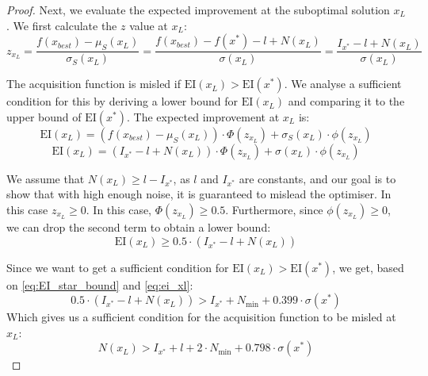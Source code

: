 {\begin{proof}
Next, we evaluate the expected improvement at the suboptimal solution $x_L$. We first calculate the $z$ value at $x_L$:
\begin{equation}
    \label{eq:z_xl}
    z_{x_L} = \frac{f(x_{best}) - \mu_S(x_L)}{\sigma_S(x_L)}=\frac{f(x_{best}) - f(x^*) - l + N(x_L)}{\sigma(x_L)}=\frac{I_{x^*}-l+N(x_L)}{\sigma(x_L)}
\end{equation}

The acquisition function is misled if $\mathrm{EI}(x_L) > \mathrm{EI}(x^*)$. We analyse a sufficient condition for this by deriving a lower bound for $\mathrm{EI}(x_L)$ and comparing it to the upper bound of $\mathrm{EI}(x^*)$. The expected improvement at $x_L$ is:
\begin{equation*}
    \mathrm{EI}(x_L) = (f(x_{best}) - \mu_S(x_L)) \cdot \Phi(z_{x_L}) + \sigma_S(x_L) \cdot \phi(z_{x_L})
\end{equation*}
\begin{equation*}
    \mathrm{EI}(x_L) = (I_{x^*} - l + N(x_L)) \cdot \Phi(z_{x_L}) + \sigma(x_L) \cdot \phi(z_{x_L})
\end{equation*}


We assume that $N(x_L) \ge l - I_{x^*}$, as $l$ and $I_{x^*}$ are constants, and our goal is to show that with high enough noise, it is guaranteed to mislead the optimiser.
In this case $z_{x_L} \ge 0$. In this case, $\Phi(z_{x_L}) \ge 0.5$. Furthermore, since $\phi(z_{x_L}) \ge 0$, we can drop the second term to obtain a lower bound:
\begin{equation}
    \label{eq:ei_xl}
    \mathrm{EI}(x_L) \ge 0.5 \cdot (I_{x^*} - l + N(x_L))
\end{equation}

Since we want to get a sufficient condition for $\mathrm{EI}(x_L) > \mathrm{EI}(x^*)$, we get, based on \autoref{eq:EI_star_bound} and \autoref{eq:ei_xl}:
\begin{equation*}
    0.5 \cdot (I_{x^*} - l + N(x_L)) > I_{x^*} + N_{\min} + 0.399 \cdot \sigma(x^*)
\end{equation*}
Which gives us a sufficient condition for the acquisition function to be misled at $x_L$:
\begin{equation*}
    \label{eq:ei_misleading}
    N(x_L) > I_{x^*} + l + 2 \cdot N_{\min} + 0.798 \cdot \sigma(x^*)
\end{equation*}


\end{proof}}
